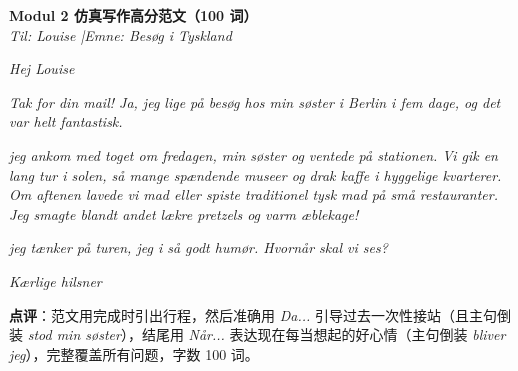 \begin{answerbox}
\textbf{Modul 2 仿真写作高分范文（100 词）}\\
\textit{Til: Louise \quad|\quad Emne: Besøg i Tyskland}

\textit{Hej Louise}

\textit{Tak for din mail! Ja, jeg  lige  på besøg hos min søster i Berlin i fem dage, og det var helt fantastisk.}

\textit{ jeg ankom med toget om fredagen,  min søster og ventede på stationen. Vi gik en lang tur i solen, så mange spændende museer og drak kaffe i hyggelige kvarterer. Om aftenen lavede vi mad eller spiste traditionel tysk mad på små restauranter. Jeg smagte blandt andet lækre pretzels og varm æblekage!}

\textit{ jeg tænker på turen,  jeg i så godt humør. Hvornår skal vi ses?}

\textit{Kærlige hilsner\\
}

\small\textbf{点评}：范文用完成时引出行程，然后准确用 \textit{Da...} 引导过去一次性接站（且主句倒装 \textit{stod min søster}），结尾用 \textit{Når...} 表达现在每当想起的好心情（主句倒装 \textit{bliver jeg}），完整覆盖所有问题，字数 100 词。
\end{answerbox}
